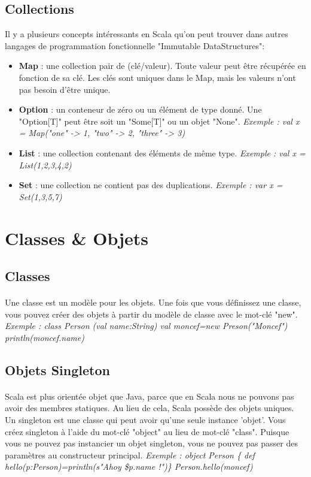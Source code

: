 \subsection{Collections}
Il y a plusieurs concepts intéressants en Scala qu'on peut trouver dans autres langages de programmation fonctionnelle "Immutable DataStructures":
\begin{itemize}
\item \textbf{Map} : une collection pair de (clé/valeur). Toute valeur peut être récupérée en fonction de sa clé. Les clés sont uniques dans le Map, mais les valeurs n'ont pas besoin d'être unique.
\item \textbf{Option} : un conteneur de zéro ou un élément de type donné. Une "Option[T]" peut être soit un "Some[T]" ou un objet "None". \textit{Exemple : val x = Map("one" -> 1, "two" -> 2, "three" -> 3)}
\item \textbf{List} : une collection contenant des éléments de même type.   \textit{Exemple : val x = List(1,2,3,4,2)}
\item \textbf{Set } : une collection ne contient pas des duplications. \textit{Exemple : var x = Set(1,3,5,7)}
\end{itemize}
\section{Classes \& Objets}
\subsection{Classes}
\paragraph{}
Une classe est un modèle pour les objets. Une fois que vous définissez une classe, vous pouvez créer des objets à partir du modèle de classe avec le mot-clé "new".\newline
\textit{Exemple : class Person (val name:String)\newline 
val moncef=new Preson("Moncef")\newline
println(moncef.name)}
\subsection{Objets Singleton}
\paragraph{}
Scala est plus orientée objet que Java, parce que en Scala nous ne pouvons pas avoir des membres statiques. Au lieu de cela, Scala possède des objets uniques. Un singleton est une classe qui peut avoir qu'une seule instance 'objet'. Vous créez singleton à l'aide du mot-clé "object" au lieu de mot-clé "class". Puisque vous ne pouvez pas instancier un objet singleton, vous ne pouvez pas passer des paramètres au constructeur principal.
\textit{Exemple : object Person \{ def hello(p:Person)=println(s"Ahoy \$p.name !")\}\newline
Person.hello(moncef)}
